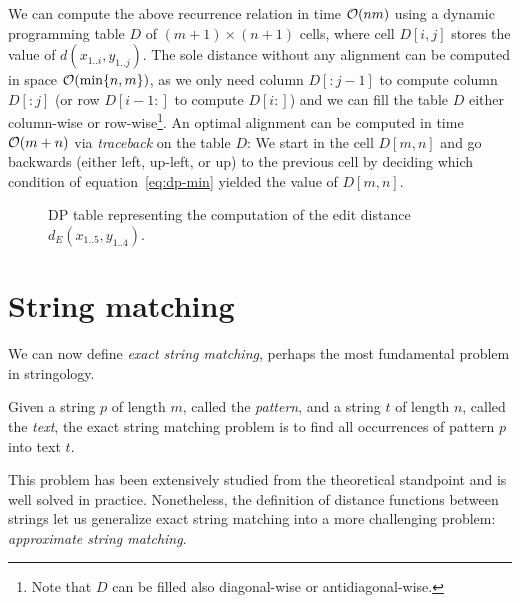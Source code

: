 We can compute the above recurrence relation in time $\mathcal{O}(nm)$ using a dynamic programming table $D$ of $(m+1) \times (n+1)$ cells, where cell $D[i,j]$ stores the value of $d(x_{1..i},y_{1..j})$.
The sole distance without any alignment can be computed in space $\mathcal{O}(\text{min}\{ n, m \})$, as we only need column $D[:j-1]$ to compute column $D[:j]$ (or row $D[i-1:]$ to compute $D[i:]$) and we can fill the table $D$ either column-wise or row-wise\footnote{Note that $D$ can be filled also diagonal-wise or antidiagonal-wise.}.
An optimal alignment can be computed in time $\mathcal{O}(m + n)$ via \emph{traceback} on the table $D$:
We start in the cell $D[m,n]$ and go backwards (either left, up-left, or up) to the previous cell by deciding which condition of equation~\ref{eq:dp-min} yielded the value of $D[m,n]$.

\begin{figure}[h]
\begin{center}
\caption[Example of DP table]{DP table representing the computation of the edit distance $d_E(x_{1..5}, y_{1..4})$.}
\label{fig:edit-dp}

\end{center}
\end{figure}



\section{String matching}


We can now define \emph{exact string matching}, perhaps the most fundamental problem in stringology.
\begin{definition}
\citep{Gusfield1997}
Given a string $p$ of length $m$, called the \emph{pattern}, and a string $t$ of length $n$, called the \emph{text}, the exact string matching problem is to find all occurrences of pattern $p$ into text $t$.
\end{definition}

This problem has been extensively studied from the theoretical standpoint and is well solved in practice.
Nonetheless, the definition of distance functions between strings let us generalize exact string matching into a more challenging problem: \emph{approximate string matching}.

